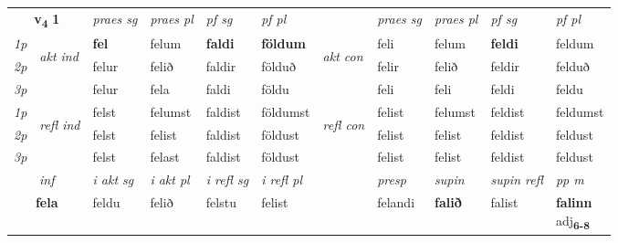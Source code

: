 \noindent
\begin{tabular}{lllllllllll} \toprule
\multicolumn{2}{c}{\textbf{v{\textsubscript{4}}} \Large{\textbf{1}}}  &  \textit{praes sg}  & \textit{praes pl}  &\textit{ pf sg} & \textit{pf pl} &  &  \textit{praes sg}  & \textit{praes pl}  & \textit{pf sg} & \textit{pf pl } \\*
	\cmidrule{3-6} \cmidrule{8-11}
 {\textit{1p}} & \multirow{3}{*}{\begin{turn}{90}\textit{akt ind}\end{turn}} & \textbf{fel} & felum & \textbf{faldi} & \textbf{földum} & \multirow{3}{*}{\begin{turn}{90}\textit{akt con}\end{turn}} &feli & felum & \textbf{feldi} & feldum\\*
 {\textit{2p}} &  &  felur  & felið & faldir & földuð & & felir & felið & feldir & felduð \\*
{\textit{3p}} &  & felur & fela & faldi & földu & & feli & feli& feldi & feldu \\*
\cmidrule{3-6} \cmidrule{8-11}
 {\textit{1p}} & \multirow{3}{*}{\begin{turn}{90}\textit{refl ind}\end{turn}}  & felst & felumst & faldist & földumst & \multirow{3}{*}{\begin{turn}{90}\textit{refl con}\end{turn}}  &felist & felumst & feldist & feldumst \\*
 {\textit{2p}} &  & felst & felist & faldist & földust & &felist & felist & feldist & feldust \\*
 {\textit{3p}}  & & felst & felast & faldist & földust & & felist & felist& feldist & feldust \\*
\cmidrule{3-6} \cmidrule{8-11}

   \multicolumn{2}{c}{\textit{inf}}  & \textit{i akt sg} & \textit{i akt pl} & \textit{i refl sg} & \textit{i refl pl} && \textit{presp} & \textit{supin} & \textit{supin refl} & \textit{pp m} \\*
  \multicolumn{2}{c}{\textbf{fela}} & feldu  & felið & felstu & felist && felandi &  \textbf{falið} & falist & \specialcell{\textbf{falinn} \\ adj\textbf{\textsubscript{6-8}}} \\*
\end{tabular}


